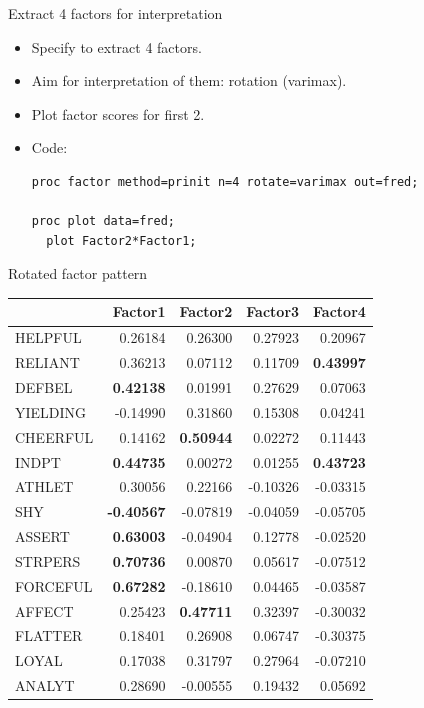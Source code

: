 \documentclass[pdf]{prosper}
\begin{document}
\begin{slide}{Extract 4 factors for interpretation}

  \begin{itemize}
  \item Specify to extract 4 factors.
  \item Aim for interpretation of them: rotation (varimax).
  \item Plot factor scores for first 2.
  \item Code:

\begin{verbatim}
proc factor method=prinit n=4 rotate=varimax out=fred;

proc plot data=fred;
  plot Factor2*Factor1;

\end{verbatim}
  \end{itemize}
  
\end{slide}


\begin{slide}{Rotated factor pattern}


{\scriptsize
\begin{tabular}{lrrrr}
              &  Factor1   &    Factor2   &      Factor3  &     Factor4 \\
\hline
 HELPFUL      &  0.26184   &    0.26300   &      0.27923  &     0.20967 \\
 RELIANT      &  0.36213   &    0.07112   &      0.11709  &     {\bf 0.43997} \\
 DEFBEL       &  {\bf 0.42138}   &    0.01991   &      0.27629  &     0.07063 \\
 YIELDING     & -0.14990   &    0.31860   &      0.15308  &     0.04241 \\
 CHEERFUL     &  0.14162   &    {\bf 0.50944}   &      0.02272  &     0.11443 \\
 INDPT        &  {\bf 0.44735}   &    0.00272   &      0.01255  & {\bf 0.43723} \\
 ATHLET       &  0.30056   &    0.22166   &     -0.10326  &    -0.03315 \\
 SHY          & {\bf -0.40567}   &   -0.07819   &     -0.04059  &    -0.05705 \\
 ASSERT       &  {\bf 0.63003}   &   -0.04904   &      0.12778  &    -0.02520 \\
 STRPERS      &  {\bf 0.70736}   &    0.00870   &      0.05617  &    -0.07512 \\
 FORCEFUL     &  {\bf 0.67282}   &   -0.18610   &      0.04465  &    -0.03587 \\
 AFFECT       &  0.25423   &   {\bf 0.47711}   &      0.32397  &    -0.30032 \\
 FLATTER      &  0.18401   &    0.26908   &      0.06747  &    -0.30375 \\
 LOYAL        &  0.17038   &    0.31797   &      0.27964  &    -0.07210 \\
 ANALYT       &  0.28690   &   -0.00555   &      0.19432  &     0.05692 \\
\hline
\end{tabular}
}
\end{slide}
\end{document}
